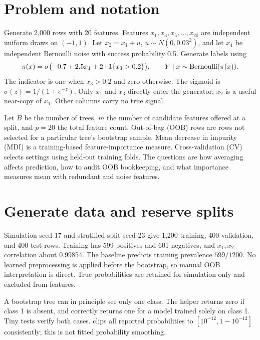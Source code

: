 


\section*{Problem and notation}
Generate 2,000 rows with 20 features. Features $x_1,x_3,x_5,\ldots,x_{20}$ are independent uniform draws on $(-1,1)$. Let $x_2=x_1+u$, $u\sim N(0,0.03^2)$, and let $x_4$ be independent Bernoulli noise with success probability 0.5. Generate labels using
\[\pi(x)=\sigma\bigl(-0.7+2.5x_1+2\cdot\mathbf{1}\{x_3>0.2\}\bigr),\qquad
Y\mid x\sim\operatorname{Bernoulli}(\pi(x)).\]
The indicator is one when $x_3>0.2$ and zero otherwise. The sigmoid is $\sigma(z)=1/(1+e^{-z})$. Only $x_1$ and $x_3$ directly enter the generator; $x_2$ is a useful near-copy of $x_1$. Other columns carry no true signal.

Let $B$ be the number of trees, $m$ the number of candidate features offered at a split, and $p=20$ the total feature count. Out-of-bag (OOB) rows are rows not selected for a particular tree's bootstrap sample. Mean decrease in impurity (MDI) is a training-based feature-importance measure. Cross-validation (CV) selects settings using held-out training folds.
The questions are how averaging affects prediction, how to audit OOB bookkeeping, and what importance measures mean with redundant and noise features.

\section{Generate data and reserve splits}
Simulation seed 17 and stratified split seed 23 give 1,200 training, 400 validation, and 400 test rows. Training has 599 positives and 601 negatives, and $x_1,x_2$ correlation about 0.99854. The baseline predicts training prevalence $599/1200$.
No learned preprocessing is applied before the bootstrap, so manual OOB interpretation is direct. True probabilities are retained for simulation only and excluded from features.

A bootstrap tree can in principle see only one class. The helper returns zero if class 1 is absent, and correctly returns one for a model trained solely on class 1. Tiny tests verify both cases.  clips all reported probabilities to $[10^{-12},1-10^{-12}]$ consistently; this is not fitted probability smoothing.

